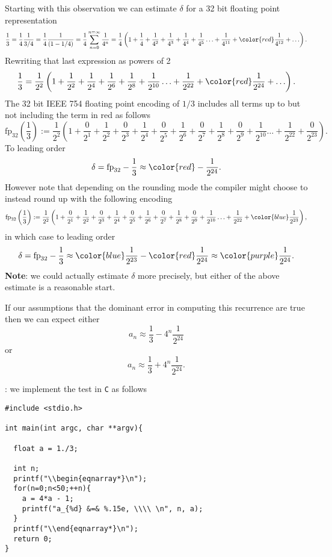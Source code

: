 Starting with this observation we can estimate $\delta$ for a 32 bit floating point representation
\[
\frac13 = \frac{1}{4} \frac{1}{3/4} = \frac14 \frac{1}{(1 - 1/4)} = \frac14 \sum_{n=0}^{n=\infty} \frac{1}{4^n} = \frac14 \left( 1 + \frac14 + \frac{1}{4^2} + \frac{1}{4^3} + \frac{1}{4^4} + \frac{1}{4^5} \ldots + \frac{1}{4^{11}} + {\color{red}\frac{1}{4^{12}}} + \ldots \right). 
\]
Rewriting that last expression as powers of 2 
\[
\frac13 = \frac{1}{2^2} \left( 1 + \frac{1}{2^2}+ \frac{1}{2^4} + \frac{1}{2^6} + \frac{1}{2^8} + \frac{1}{2^{10}} \ldots + \frac{1}{2^{22}} + {\color{red}\frac{1}{2^{24}}} + \ldots \right). 
\]
The 32 bit IEEE 754 floating point encoding of $1/3$ includes all terms up to but not including the term in red as follows
\[
\mbox{fp}_{32}\left(\frac13\right) := \frac{1}{2^2} \left( 1 + \frac{0}{2^1} +  \frac{1}{2^2}+ \frac{0}{2^3} +\frac{1}{2^4} +\frac{0}{2^5} + \frac{1}{2^6} + \frac{0}{2^7} +\frac{1}{2^8} +\frac{0}{2^9} + \frac{1}{2^{10}} \ldots + \frac{1}{2^{22}} + \frac{0}{2^{23}} \right). 
\]
To leading order
\[
\delta = \mbox{fp}_{32} - \frac13 \approx {\color{red}-\frac{1}{2^{24}}}.
\]
However note that depending on the rounding mode the compiler might choose to instead round up with the following encoding 
\[
\mbox{fp}_{32}\left(\frac13\right) := \frac{1}{2^2} \left( 1 + \frac{0}{2^1} +  \frac{1}{2^2}+ \frac{0}{2^3} +\frac{1}{2^4} +\frac{0}{2^5} + \frac{1}{2^6} + \frac{0}{2^7} +\frac{1}{2^8} +\frac{0}{2^9} + \frac{1}{2^{10}} \ldots + \frac{1}{2^{22}} + {\color{blue}\frac{1}{2^{23}}} \right),
\]
in which case to leading order
\[
\delta = \mbox{fp}_{32} - \frac13 \approx {\color{blue}\frac{1}{2^{23}}-\color{red}\frac{1}{2^{24}}} \approx {\color{purple}\frac{1}{2^{24}}}.
\]
{\bf Note}: we could actually estimate $\delta$ more precisely, but either of the above estimate is a reasonable start.

If our assumptions that the dominant error in computing this recurrence are true then we can expect  either
\[
a_n \approx \frac13  - 4^n \frac{1}{2^{24}} 
\]
or
\[
a_n \approx \frac13  + 4^n \frac{1}{2^{24}}. 
\]

\vspace{8pt}: we implement the test in \texttt{C} as follows

\begin{verbatim}
#include <stdio.h>

int main(int argc, char **argv){

  float a = 1./3;

  int n;
  printf("\\begin{eqnarray*}\n");
  for(n=0;n<50;++n){
    a = 4*a - 1;
    printf("a_{%d} &=& %.15e, \\\\ \n", n, a);
  }
  printf("\\end{eqnarray*}\n");
  return 0;
}
\end{verbatim}

